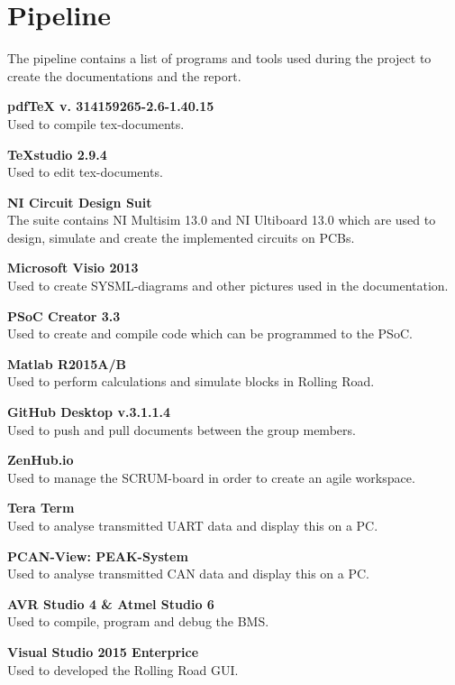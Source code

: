 \chapter{Pipeline}
The pipeline contains a list of programs and tools used during the project to create the documentations and the report.

\textbf{pdfTeX v. 314159265-2.6-1.40.15}\\
Used to compile tex-documents.

\textbf{TeXstudio 2.9.4}\\
Used to edit tex-documents.

\textbf{NI Circuit Design Suit}\\
The suite contains NI Multisim 13.0 and NI Ultiboard 13.0 which are used to design, simulate and create the implemented circuits on PCBs.

\textbf{Microsoft Visio 2013}\\
Used to create SYSML-diagrams and other pictures used in the documentation.

\textbf{PSoC Creator 3.3}\\
Used to create and compile code which can be programmed to the PSoC.

\textbf{Matlab R2015A/B}\\
Used to perform calculations and simulate blocks in Rolling Road.

\textbf{GitHub Desktop v.3.1.1.4}\\
Used to push and pull documents between the group members.

\textbf{ZenHub.io}\\
Used to manage the SCRUM-board in order to create an agile workspace.

\textbf{Tera Term}\\
Used to analyse transmitted UART data and display this on a PC.

\textbf{PCAN-View: PEAK-System}\\
Used to analyse transmitted CAN data and display this on a PC.

\textbf{AVR Studio 4 \& Atmel Studio 6}\\
Used to compile, program and debug the BMS.

\textbf{Visual Studio 2015 Enterprice}\\
Used to developed the Rolling Road GUI.

